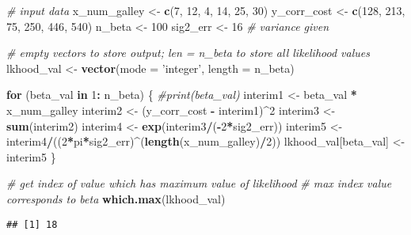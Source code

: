 \documentclass[
]{article}
\newenvironment{Shaded}{\begin{snugshade}}{\end{snugshade}}
\newcommand{\CommentTok}[1]{\textcolor[rgb]{0.56,0.35,0.01}{\textit{#1}}}
\newcommand{\ControlFlowTok}[1]{\textcolor[rgb]{0.13,0.29,0.53}{\textbf{#1}}}
\newcommand{\DataTypeTok}[1]{\textcolor[rgb]{0.13,0.29,0.53}{#1}}
\newcommand{\DecValTok}[1]{\textcolor[rgb]{0.00,0.00,0.81}{#1}}
\newcommand{\KeywordTok}[1]{\textcolor[rgb]{0.13,0.29,0.53}{\textbf{#1}}}
\newcommand{\NormalTok}[1]{#1}
\newcommand{\OperatorTok}[1]{\textcolor[rgb]{0.81,0.36,0.00}{\textbf{#1}}}
\newcommand{\StringTok}[1]{\textcolor[rgb]{0.31,0.60,0.02}{#1}}
\begin{document}
\begin{Shaded}
\begin{Highlighting}[]
\CommentTok{# input data}
\NormalTok{x_num_galley <-}\StringTok{ }\KeywordTok{c}\NormalTok{(}\DecValTok{7}\NormalTok{, }\DecValTok{12}\NormalTok{, }\DecValTok{4}\NormalTok{, }\DecValTok{14}\NormalTok{, }\DecValTok{25}\NormalTok{, }\DecValTok{30}\NormalTok{)}
\NormalTok{y_corr_cost <-}\StringTok{ }\KeywordTok{c}\NormalTok{(}\DecValTok{128}\NormalTok{, }\DecValTok{213}\NormalTok{, }\DecValTok{75}\NormalTok{, }\DecValTok{250}\NormalTok{, }\DecValTok{446}\NormalTok{, }\DecValTok{540}\NormalTok{)}
\NormalTok{n_beta <-}\StringTok{ }\DecValTok{100}
\NormalTok{sig2_err <-}\StringTok{ }\DecValTok{16} \CommentTok{# variance given}


\CommentTok{# empty vectors to store output; len = n_beta to store all likelihood values}
\NormalTok{lkhood_val <-}\StringTok{ }\KeywordTok{vector}\NormalTok{(}\DataTypeTok{mode =} \StringTok{'integer'}\NormalTok{, }\DataTypeTok{length =}\NormalTok{ n_beta) }

\ControlFlowTok{for}\NormalTok{ (beta_val }\ControlFlowTok{in} \DecValTok{1}\OperatorTok{:}\StringTok{ }\NormalTok{n_beta) \{}
  \CommentTok{#print(beta_val)}
\NormalTok{  interim1 <-}\StringTok{  }\NormalTok{beta_val }\OperatorTok{*}\StringTok{ }\NormalTok{x_num_galley}
\NormalTok{  interim2 <-}\StringTok{  }\NormalTok{(y_corr_cost }\OperatorTok{-}\StringTok{ }\NormalTok{interim1)}\OperatorTok{^}\DecValTok{2}
\NormalTok{  interim3 <-}\StringTok{  }\KeywordTok{sum}\NormalTok{(interim2)}
\NormalTok{  interim4 <-}\StringTok{ }\KeywordTok{exp}\NormalTok{(interim3}\OperatorTok{/}\NormalTok{(}\OperatorTok{-}\DecValTok{2}\OperatorTok{*}\NormalTok{sig2_err))}
\NormalTok{  interim5 <-}\StringTok{ }\NormalTok{interim4}\OperatorTok{/}\NormalTok{((}\DecValTok{2}\OperatorTok{*}\NormalTok{pi}\OperatorTok{*}\NormalTok{sig2_err)}\OperatorTok{^}\NormalTok{(}\KeywordTok{length}\NormalTok{(x_num_galley)}\OperatorTok{/}\DecValTok{2}\NormalTok{))}
\NormalTok{  lkhood_val[beta_val] <-}\StringTok{ }\NormalTok{interim5}
\NormalTok{\}}

\CommentTok{# get index of value which has maximum value of likelihood}
\CommentTok{# max index value corresponds to beta}
\KeywordTok{which.max}\NormalTok{(lkhood_val)}
\end{Highlighting}
\end{Shaded}

\begin{verbatim}
## [1] 18
\end{verbatim}
\end{document}
